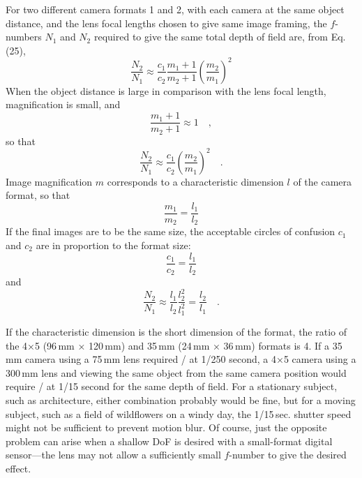 \documentclass[11pt, oneside]{scrartcl}   	%
\newcommand{\f}[1]{\mbox{\raisebox{2pt}{\footnotesize $f$\hspace{-1.2pt}}/\hspace{-0.6pt}\raisebox{-0.6pt}{\small #1}}}
\begin{document}
For two different camera formats 1 and 2, with each camera at the same object distance, and the lens focal lengths chosen to give same image framing, the $f$-numbers $N_1 $ and $N_2$ required to give the same total depth of field are, from Eq. (25),
\begin{equation}
\frac{N_2}{N_1}\approx\frac{c_1}{c_2}\frac{m_1+1}{m_2+1}\left(\frac{m_2}{m_1}\right)^2
   \label{eq:72}
\end{equation}
When the object distance is large in comparison with the lens focal length, magnification is small, and
\begin{equation}
\frac{m_1+1}{m_2+1} \approx 1\quad,
\end{equation}
so that
\begin{equation}
\frac{N_2}{N_1}\approx\frac{c_1}{c_2}\left(\frac{m_2}{m_1}\right)^2\quad.
   \label{eq:73}
\end{equation}
Image magnification $m$ corresponds to a characteristic dimension $l$ of the camera format, so that
\begin{equation}
\frac{m_1}{m_2} = \frac{l_1}{l_2}
   \label{eq:74}
\end{equation}
If the final images are to be the same size, the acceptable circles of confusion $c_1$ and $c_2$ are in proportion to the format size:
\begin{equation}
\frac{c_1}{c_2} = \frac{l_1}{l_2}
   \label{eq:75}
\end{equation}
and
\begin{equation}
\frac{N_2}{N_1}\approx \frac{l_1}{l_2}  \frac{l_2^2}{l_1^2} =  \frac{l_2}{l_1}\quad.
   \label{eq:73}
\end{equation}

If the characteristic dimension is the short dimension of the format, the ratio of the 4×5 (96\,mm × 120\,mm) and 35\,mm (24\,mm × 36\,mm) formats is 4. If a 35\,mm camera using a 75\,mm lens required \f8 at 1/250 second, a 4×5 camera using a 300\,mm lens and viewing the same object from the same camera position would require \f{32} at 1/15 second for the same depth of field. For a stationary subject, such as architecture, either combination probably would be fine, but for a moving subject, such as a field of wildflowers on a windy day, the 1/15\,sec. shutter speed might not be sufficient to prevent motion blur. Of course, just the opposite problem can arise when a shallow DoF is desired with a small-format digital sensor—the lens may not allow a sufficiently small $f$-number to give the desired effect.
\end{document}
